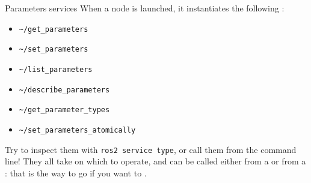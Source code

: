 \begin{frame}{Parameters services}
  \justifying
  When a node is launched, it  instantiates the following :
  \begin{itemize}
    \item \texttt{\textasciitilde/get\_parameters}
    \item \texttt{\textasciitilde/set\_parameters}
    \item \texttt{\textasciitilde/list\_parameters}
    \item \texttt{\textasciitilde/describe\_parameters}
    \item \texttt{\textasciitilde/get\_parameter\_types}
    \item \texttt{\textasciitilde/set\_parameters\_atomically}
  \end{itemize}
  Try to inspect them with \texttt{ros2 service type}, or call them from the command line! They all take  on which to operate, and can be called either from a  or from a : that is the way to go if you want to .
\end{frame}

